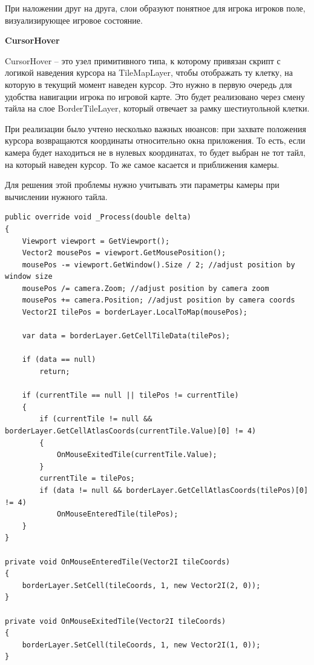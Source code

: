             При наложении друг на друга, слои образуют понятное для игрока игроков поле, визуализирующее игровое состояние.

            \textbf{CursorHover}

            CursorHover -- это узел примитивного типа, к которому привязан скрипт с логикой наведения курсора на TileMapLayer, чтобы отображать ту клетку, на которую
            в текущий момент наведен курсор. Это нужно в первую очередь для удобства навигации игрока по игровой карте. Это будет реализовано через смену тайла на слое BorderTileLayer, который
            отвечает за рамку шестиугольной клетки.

            При реализации было учтено несколько важных нюансов: при захвате положения курсора возвращаются координаты относительно окна приложения. То есть,
            если камера будет находиться не в нулевых координатах, то будет выбран не тот тайл, на который наведен курсор. То же самое касается и приближения камеры.

            Для решения этой проблемы нужно учитывать эти параметры камеры при вычислении нужного тайла.

            \begin{lstlisting}[caption=Реализация подсветки тайла]
public override void _Process(double delta)
{
    Viewport viewport = GetViewport();
    Vector2 mousePos = viewport.GetMousePosition();
    mousePos -= viewport.GetWindow().Size / 2; //adjust position by window size
    mousePos /= camera.Zoom; //adjust position by camera zoom
    mousePos += camera.Position; //adjust position by camera coords
    Vector2I tilePos = borderLayer.LocalToMap(mousePos);

    var data = borderLayer.GetCellTileData(tilePos);

    if (data == null)
        return;

    if (currentTile == null || tilePos != currentTile)
    {
        if (currentTile != null && borderLayer.GetCellAtlasCoords(currentTile.Value)[0] != 4)
        {
            OnMouseExitedTile(currentTile.Value);
        }
        currentTile = tilePos;
        if (data != null && borderLayer.GetCellAtlasCoords(tilePos)[0] != 4)
            OnMouseEnteredTile(tilePos);
    }
}

private void OnMouseEnteredTile(Vector2I tileCoords)
{
    borderLayer.SetCell(tileCoords, 1, new Vector2I(2, 0));
}

private void OnMouseExitedTile(Vector2I tileCoords)
{
    borderLayer.SetCell(tileCoords, 1, new Vector2I(1, 0));
}
            \end{lstlisting}



